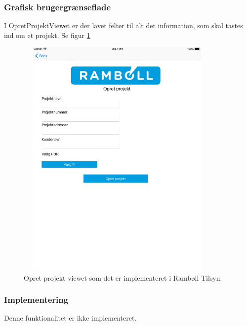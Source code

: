 \subsubsection{Grafisk brugergrænseflade}
I OpretProjektViewet er der lavet felter til alt det information, som skal tastes ind om et projekt. Se figur \ref{fig:OpretProjektView}
\begin{figure}[H] %
	\centering
	\includegraphics[height=12cm, width=10cm]{../ArkitekturDesign/Design/OpretProjekt/OpretProjektView}
	\caption{Opret projekt viewet som det er implementeret i Rambøll Tilsyn.}
	\label{fig:OpretProjektView}
\end{figure}

\subsubsection{Implementering}
Denne funktionalitet er ikke implementeret.

\clearpage